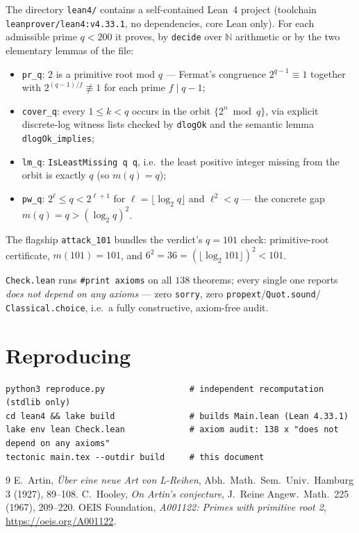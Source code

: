 \documentclass[11pt]{article}
\theoremstyle{definition}
\begin{document}
The directory \texttt{lean4/} contains a self-contained Lean~4 project
(toolchain \texttt{leanprover/lean4:v4.33.1}, no dependencies, core Lean only).
For each admissible prime $q<200$ it proves, by \texttt{decide} over $\mathbb{N}$
arithmetic or by the two elementary lemmas of the file:
\begin{itemize}
\item \texttt{pr\_q}: $2$ is a primitive root mod $q$ --- Fermat's congruence
      $2^{q-1}\equiv 1$ together with $2^{(q-1)/f}\not\equiv 1$ for each prime
      $f \mid q-1$;
\item \texttt{cover\_q}: every $1 \le k < q$ occurs in the orbit
      $\{2^n \bmod q\}$, via explicit discrete-log witness lists checked by
      \texttt{dlogOk} and the semantic lemma \texttt{dlogOk\_implies};
\item \texttt{lm\_q}: \texttt{IsLeastMissing q q}, i.e.\ the least positive
      integer missing from the orbit is exactly $q$ (so $m(q)=q$);
\item \texttt{pw\_q}: $2^{\ell} \le q < 2^{\ell+1}$ for
      $\ell=\lfloor\log_2 q\rfloor$ and $\ell^2 < q$ --- the concrete gap
      $m(q)=q > (\log_2 q)^2$.
\end{itemize}
The flagship \texttt{attack\_101} bundles the verdict's $q=101$ check:
primitive-root certificate, $m(101)=101$, and
$6^2=36=(\lfloor\log_2 101\rfloor)^2 < 101$.

\texttt{Check.lean} runs \texttt{\#print axioms} on all $138$ theorems; every
single one reports \emph{does not depend on any axioms} --- zero
\texttt{sorry}, zero \texttt{propext}/\texttt{Quot.sound}/%
\texttt{Classical.choice}, i.e.\ a fully constructive, axiom-free audit.

\section{Reproducing}

\begin{verbatim}
python3 reproduce.py                 # independent recomputation (stdlib only)
cd lean4 && lake build               # builds Main.lean (Lean 4.33.1)
lake env lean Check.lean             # axiom audit: 138 x "does not depend on any axioms"
tectonic main.tex --outdir build     # this document
\end{verbatim}

\begin{thebibliography}{9}
 E.~Artin, \emph{\"Uber eine neue Art von L-Reihen},
Abh.\ Math.\ Sem.\ Univ.\ Hamburg 3 (1927), 89--108.
 C.~Hooley, \emph{On Artin's conjecture}, J.\ Reine Angew.\
Math.\ 225 (1967), 209--220.
 OEIS Foundation, \emph{A001122: Primes with primitive root 2},
\url{https://oeis.org/A001122}.
\end{thebibliography}
\end{document}
